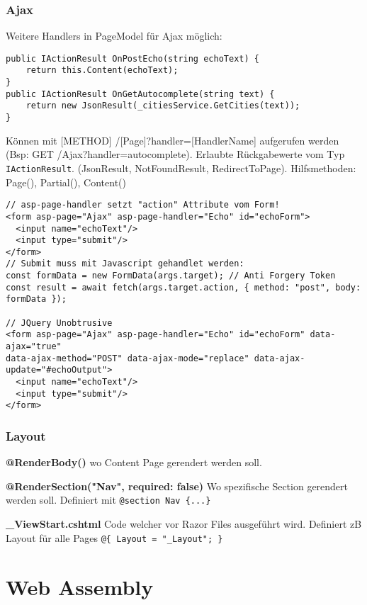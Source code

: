 \begin{multicols*}{2}
\subsubsection{Ajax}

Weitere Handlers in PageModel für Ajax möglich:
\begin{verbatim}
public IActionResult OnPostEcho(string echoText) {
    return this.Content(echoText);
}
public IActionResult OnGetAutocomplete(string text) {
    return new JsonResult(_citiesService.GetCities(text));
}
\end{verbatim}
Können mit [METHOD] /[Page]?handler=[HandlerName] aufgerufen werden (Bsp: GET /Ajax?handler=autocomplete).
Erlaubte Rückgabewerte vom Typ \lstinline|IActionResult|. (JsonResult, NotFoundResult, RedirectToPage). Hilfsmethoden: Page(), Partial(), Content()



\begin{verbatim}
// asp-page-handler setzt "action" Attribute vom Form!
<form asp-page="Ajax" asp-page-handler="Echo" id="echoForm">
  <input name="echoText"/>
  <input type="submit"/>
</form>
// Submit muss mit Javascript gehandlet werden:
const formData = new FormData(args.target); // Anti Forgery Token
const result = await fetch(args.target.action, { method: "post", body: formData });

// JQuery Unobtrusive
<form asp-page="Ajax" asp-page-handler="Echo" id="echoForm" data-ajax="true"
data-ajax-method="POST" data-ajax-mode="replace" data-ajax-update="#echoOutput">
  <input name="echoText"/>
  <input type="submit"/>
</form>
\end{verbatim}

\subsubsection{Layout}
\textbf{@RenderBody()} wo Content Page gerendert werden soll.

\textbf{@RenderSection("Nav", required: false)} Wo spezifische Section gerendert werden soll. Definiert mit \lstinline|@section Nav {...}|

\textbf{\_ViewStart.cshtml} Code welcher vor Razor Files ausgeführt wird. Definiert zB Layout für alle Pages \lstinline|@{ Layout = "_Layout"; }|

\section{Web Assembly}

\end{multicols*}
